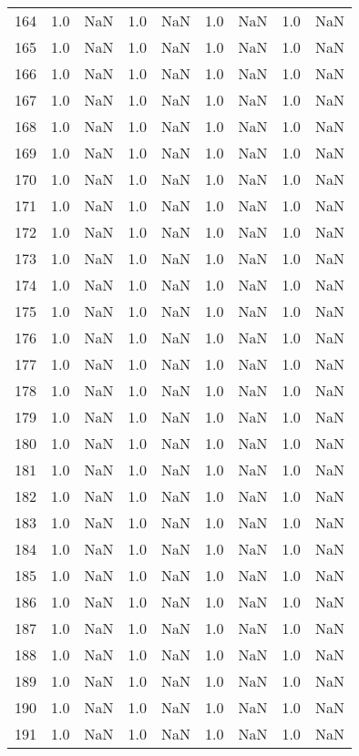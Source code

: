 \begin{tabular}{lrrrrrrrr}
164 & 1.0 & NaN & 1.0 & NaN & 1.0 & NaN & 1.0 & NaN \\
165 & 1.0 & NaN & 1.0 & NaN & 1.0 & NaN & 1.0 & NaN \\
166 & 1.0 & NaN & 1.0 & NaN & 1.0 & NaN & 1.0 & NaN \\
167 & 1.0 & NaN & 1.0 & NaN & 1.0 & NaN & 1.0 & NaN \\
168 & 1.0 & NaN & 1.0 & NaN & 1.0 & NaN & 1.0 & NaN \\
169 & 1.0 & NaN & 1.0 & NaN & 1.0 & NaN & 1.0 & NaN \\
170 & 1.0 & NaN & 1.0 & NaN & 1.0 & NaN & 1.0 & NaN \\
171 & 1.0 & NaN & 1.0 & NaN & 1.0 & NaN & 1.0 & NaN \\
172 & 1.0 & NaN & 1.0 & NaN & 1.0 & NaN & 1.0 & NaN \\
173 & 1.0 & NaN & 1.0 & NaN & 1.0 & NaN & 1.0 & NaN \\
174 & 1.0 & NaN & 1.0 & NaN & 1.0 & NaN & 1.0 & NaN \\
175 & 1.0 & NaN & 1.0 & NaN & 1.0 & NaN & 1.0 & NaN \\
176 & 1.0 & NaN & 1.0 & NaN & 1.0 & NaN & 1.0 & NaN \\
177 & 1.0 & NaN & 1.0 & NaN & 1.0 & NaN & 1.0 & NaN \\
178 & 1.0 & NaN & 1.0 & NaN & 1.0 & NaN & 1.0 & NaN \\
179 & 1.0 & NaN & 1.0 & NaN & 1.0 & NaN & 1.0 & NaN \\
180 & 1.0 & NaN & 1.0 & NaN & 1.0 & NaN & 1.0 & NaN \\
181 & 1.0 & NaN & 1.0 & NaN & 1.0 & NaN & 1.0 & NaN \\
182 & 1.0 & NaN & 1.0 & NaN & 1.0 & NaN & 1.0 & NaN \\
183 & 1.0 & NaN & 1.0 & NaN & 1.0 & NaN & 1.0 & NaN \\
184 & 1.0 & NaN & 1.0 & NaN & 1.0 & NaN & 1.0 & NaN \\
185 & 1.0 & NaN & 1.0 & NaN & 1.0 & NaN & 1.0 & NaN \\
186 & 1.0 & NaN & 1.0 & NaN & 1.0 & NaN & 1.0 & NaN \\
187 & 1.0 & NaN & 1.0 & NaN & 1.0 & NaN & 1.0 & NaN \\
188 & 1.0 & NaN & 1.0 & NaN & 1.0 & NaN & 1.0 & NaN \\
189 & 1.0 & NaN & 1.0 & NaN & 1.0 & NaN & 1.0 & NaN \\
190 & 1.0 & NaN & 1.0 & NaN & 1.0 & NaN & 1.0 & NaN \\
191 & 1.0 & NaN & 1.0 & NaN & 1.0 & NaN & 1.0 & NaN \\

\end{tabular}
